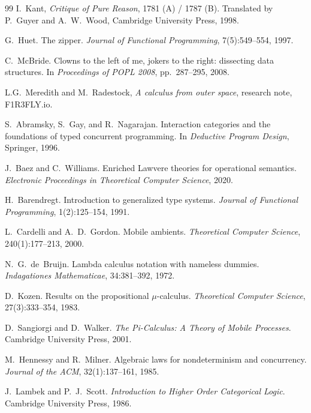 \begin{thebibliography}{99}
I.~Kant, \emph{Critique of Pure Reason}, 1781 (A) / 1787 (B). Translated by P.~Guyer and A.~W.~Wood, Cambridge University Press, 1998.

G.~Huet. The zipper. \emph{Journal of Functional Programming}, 7(5):549--554, 1997.

C.~McBride. Clowns to the left of me, jokers to the right: dissecting data structures. In \emph{Proceedings of POPL 2008}, pp.~287--295, 2008.

L.G.~Meredith and M.~Radestock, \emph{A calculus from outer space}, research note, F1R3FLY.io.




S.~Abramsky, S.~Gay, and R.~Nagarajan.
\newblock Interaction categories and the foundations of typed concurrent programming.
\newblock In \emph{Deductive Program Design}, Springer, 1996.

J.~Baez and C.~Williams.
\newblock Enriched Lawvere theories for operational semantics.
\newblock \emph{Electronic Proceedings in Theoretical Computer Science}, 2020.

H.~Barendregt.
\newblock Introduction to generalized type systems.
\newblock \emph{Journal of Functional Programming}, 1(2):125--154, 1991.

L.~Cardelli and A.~D.~Gordon.
\newblock Mobile ambients.
\newblock \emph{Theoretical Computer Science}, 240(1):177--213, 2000.

N.~G.~de~Bruijn.
\newblock Lambda calculus notation with nameless dummies.
\newblock \emph{Indagationes Mathematicae}, 34:381--392, 1972.

D.~Kozen. \newblock Results on the propositional $\mu$-calculus. \newblock \emph{Theoretical Computer Science}, 27(3):333--354, 1983.

D.~Sangiorgi and D.~Walker. \newblock \emph{The Pi-Calculus: A Theory of Mobile Processes}. \newblock Cambridge University Press, 2001.

M.~Hennessy and R.~Milner.
\newblock Algebraic laws for nondeterminism and concurrency.
\newblock \emph{Journal of the ACM}, 32(1):137--161, 1985.

J.~Lambek and P.~J.~Scott.
\newblock \emph{Introduction to Higher Order Categorical Logic}.
\newblock Cambridge University Press, 1986.


\end{thebibliography}
